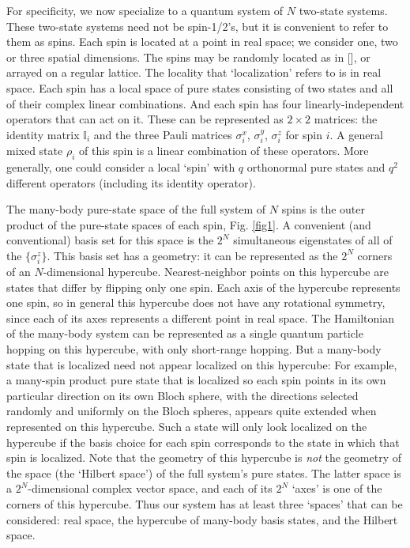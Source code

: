 \documentclass[amsmath,onecolumn, superscriptaddress,preprint,aps]{revtex4}
\renewcommand{\cite}[1]{[\onlinecite{#1}]}
\begin{document}
 For specificity, we now specialize to a quantum system of $N$ two-state systems.  These two-state systems need not be spin-1/2's, but it is convenient to refer to them as spins.  Each spin is located at a point in real space; we consider one, two or three spatial dimensions.  The spins may be randomly located as in \cite{Anderson}, or arrayed on a regular lattice.  The locality that `localization' refers to is in real space.  Each spin has a local space of pure states consisting of two states and all of their complex linear combinations.  And each spin has four linearly-independent operators that can act on it.  These can be represented as $2\times 2$ matrices: the identity matrix $\mathbb{I}_i$ and the three Pauli matrices $\sigma^x_i$, $\sigma^y_i$, $\sigma^z_i$ for spin $i$.  A general mixed state $\rho_i$ of this spin is a linear combination of these operators.  More generally, one could consider a local `spin' with $q$ orthonormal pure states and $q^2$ different operators (including its identity operator).

 The many-body pure-state space of the full system of $N$ spins is the outer product of the pure-state spaces of each spin, Fig. \ref{fig1}.  A convenient (and conventional) basis set for this space is the $2^N$ simultaneous eigenstates of all of the $\{\sigma^z_i\}$.  This basis set has a geometry: it can be represented as the $2^N$ corners of an $N$-dimensional hypercube.  Nearest-neighbor points on this hypercube are states that differ by flipping only one spin.  Each axis of the hypercube represents one spin, so in general this hypercube does not have any rotational symmetry, since each of its axes represents a different point in real space.  The Hamiltonian of the many-body system can be represented as a single quantum particle hopping on this hypercube, with only short-range hopping.  But a many-body state that is localized need not appear localized on this hypercube: For example, a many-spin product pure state that is localized so each spin points in its own particular direction on its own Bloch sphere, with the directions selected randomly and uniformly on the Bloch spheres, appears quite extended when represented on this hypercube.  Such a state will only look localized on the hypercube if the basis choice for each spin corresponds to the state in which that spin is localized.  Note that the geometry of this hypercube is {\it not} the geometry of the space (the `Hilbert space') of the full system's pure states.  The latter space is a $2^N$-dimensional complex vector space, and each of its $2^N$ `axes' is one of the corners of this hypercube.  Thus our system has at least three `spaces' that can be considered: real space, the hypercube of many-body basis states, and the Hilbert space.
\end{document}
